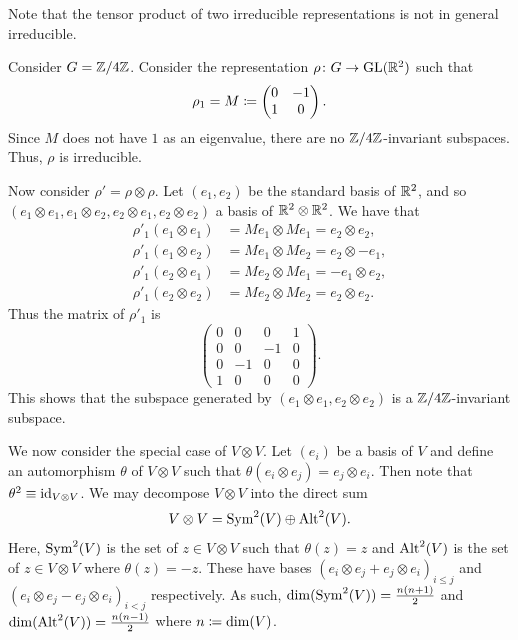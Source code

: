 \documentclass[letterpaper, 11pt, oneside]{book}
\begin{document}
Note that the tensor product of two irreducible representations is not in general irreducible.
\begin{ex}
  Consider $G = \mathbb{Z}/4\mathbb{Z}$.
  Consider the representation $\rho\colon G \to \operatorname{GL}(\mathbb{R}^{2})$ such that
  \[
    \rho_{1} = M \coloneqq
    \begin{pmatrix}
      0 & -1 \\
      1 & 0
    \end{pmatrix}.
  \]
  Since $M$ does not have $1$ as an eigenvalue, there are no $\mathbb{Z}/4\mathbb{Z}$-invariant subspaces.
  Thus, $\rho$ is irreducible.

  Now consider $\rho' = \rho \otimes \rho$.
  Let $(e_{1}, e_{2})$ be the standard basis of $\mathbb{R}^{2}$, and so $(e_{1} \otimes e_{1}, e_{1} \otimes e_{2}, e_{2} \otimes e_{1}, e_{2} \otimes e_{2})$ a basis of $\mathbb{R}^{2} \otimes \mathbb{R}^{2}$.
  We have that
  \begin{align*}
    \rho'_{1}(e_{1} \otimes e_{1}) &= M e_{1} \otimes M e_{1} = e_{2} \otimes e_{2}, \\
    \rho'_{1}(e_{1} \otimes e_{2}) &= M e_{1} \otimes M e_{2} = e_{2} \otimes -e_{1}, \\
    \rho'_{1}(e_{2} \otimes e_{1}) &= M e_{2} \otimes M e_{1} = -e_{1} \otimes e_{2}, \\
    \rho'_{1}(e_{2} \otimes e_{2}) &= M e_{2} \otimes M e_{2} = e_{2} \otimes e_{2}.
  \end{align*}
  Thus the matrix of $\rho'_{1}$ is
  \[
    \begin{pmatrix}
      0 & 0 & 0 & 1 \\
      0 & 0 & -1 & 0 \\
      0 & -1 & 0 & 0 \\
      1 & 0 & 0 & 0
    \end{pmatrix}.
  \]
  This shows that the subspace generated by $(e_{1} \otimes e_{1}, e_{2} \otimes e_{2})$ is a $\mathbb{Z}/4\mathbb{Z}$-invariant subspace.
\end{ex}


We now consider the special case of $V \otimes V$.
Let $(e_{i})$ be a basis of $V$ and define an automorphism $\theta$ of $V \otimes V$ such that $\theta(e_{i} \otimes e_{j}) = e_{j} \otimes e_{i}$.
Then note that $\theta^{2} \equiv \operatorname{id}_{V \otimes V}$.
We may decompose $V \otimes V$ into the direct sum
\[
  V \otimes V = \operatorname{Sym}^{2}(V) \oplus \operatorname{Alt}^{2}(V).
\]
Here, $\operatorname{Sym}^{2}(V)$ is the set of $z \in V \otimes V$ such that $\theta(z) = z$ and $\operatorname{Alt}^{2}(V)$ is the set of $z \in V \otimes V$ where $\theta(z) = -z$.
These have bases $(e_{i} \otimes e_{j} + e_{j} \otimes e_{i})_{i \leq j}$ and $(e_{i} \otimes e_{j} - e_{j} \otimes e_{i})_{i < j}$ respectively.
As such, $\dim(\operatorname{Sym}^{2}(V)) = \frac{n(n + 1)}{2}$ and $\dim(\operatorname{Alt}^{2}(V)) = \frac{n(n - 1)}{2}$ where $n \coloneqq \dim(V)$.
\end{document}
